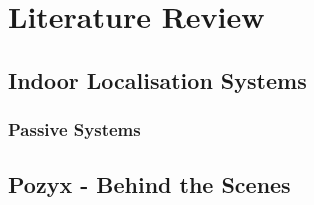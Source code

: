 \chapter{Literature Review}\label{ch:literature-review}
\section{Indoor Localisation Systems}\label{sec:indoor-localisation-sensors}
\subsection*{Passive Systems}

\section{Pozyx - Behind the Scenes}\label{sec:pozyx---behind-the-scenes}
